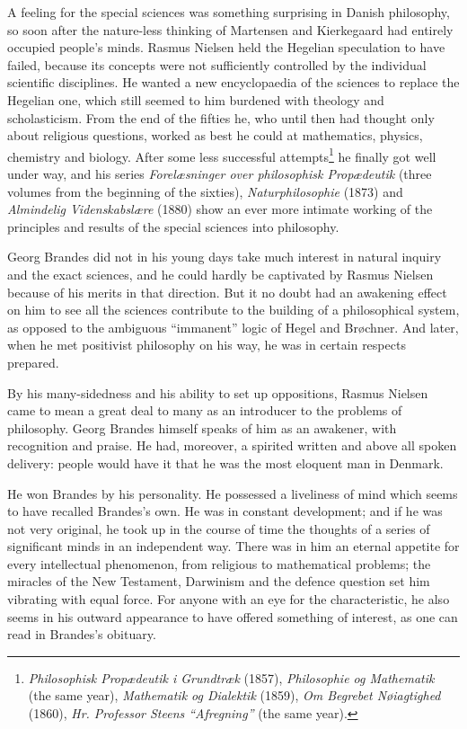 \documentclass[12pt,a4paper,openany]{book}
\newcommand{\opage}[1]{\marginnote{\footnotesize\textit{[#1]}}}
\begin{document}
A feeling for the special sciences was something surprising in Danish philosophy, so soon after the nature-less
thinking of Martensen and Kierkegaard had entirely occupied people's minds. Rasmus Nielsen held the Hegelian
speculation to have failed, because its concepts were not sufficiently controlled by the individual scientific
disciplines. He wanted a new encyclopaedia of the sciences to replace the Hegelian one, which still seemed to him
burdened with theology and scholasticism. From the end of the fifties he, who until then had thought only about
religious questions, worked
\opage{147}\setcounter{footnote}{0}%
as best he could at mathematics, physics, chemistry and biology. After some less successful
attempts\footnote{\textit{Philosophisk Propædeutik i Grundtræk} (1857), \textit{Philosophie og Mathematik} (the same year), \textit{Mathematik og Dialektik} (1859), \textit{Om Begrebet Nøiagtighed} (1860), \textit{Hr. Professor Steens ``Afregning''} (the same year).}
he finally got well under way, and his series \textit{Forelæsninger over philosophisk Propædeutik} (three volumes
from the beginning of the sixties), \textit{Naturphilosophie} (1873) and \textit{Almindelig Videnskabslære} (1880)
show an ever more intimate working of the principles and results of the special sciences into philosophy.

Georg Brandes did not in his young days take much interest in natural inquiry and the exact sciences, and he could
hardly be captivated by Rasmus Nielsen because of his merits in that direction. But it no doubt had an awakening
effect on him to see all the sciences contribute to the building of a philosophical system, as opposed to the
ambiguous ``immanent'' logic of Hegel and Brøchner. And later, when he met positivist philosophy on his way, he was
in certain respects prepared.

By his many-sidedness and his ability to set up oppositions, Rasmus Nielsen came to mean a great deal to many as an
introducer to the problems of philosophy. Georg Brandes himself speaks of him as an awakener, with recognition and
praise. He had, moreover, a spirited written and above all spoken delivery: people would have it that he was the
most eloquent man in Denmark.

He won Brandes by his personality. He possessed a liveliness of mind which seems to have recalled Brandes's own. He
was in constant development; and if he was not very original, he took up in the course of time the thoughts of a
series of significant minds in an independent way. There was in him an eternal appetite for every intellectual
phenomenon, from religious to mathematical problems; the miracles of the New Testament, Darwinism and the defence
question set him vibrating with equal force. For anyone with an eye for the characteristic, he also seems in his
outward appearance to have offered something of interest, as one can read in Brandes's obituary.
\end{document}
